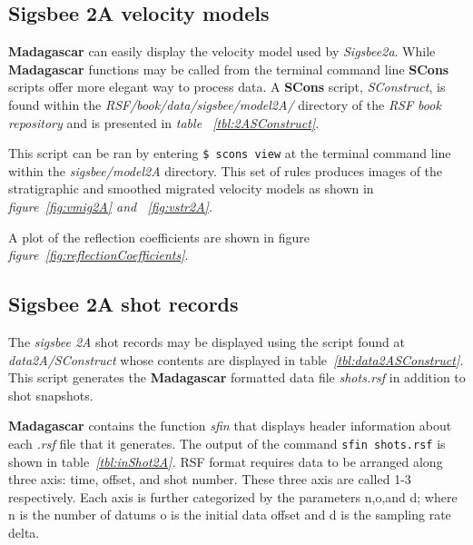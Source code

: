 \subsection{Sigsbee 2A velocity models}
\textbf{Madagascar} can easily display the velocity model used by \emph{Sigsbee2a}.  While \textbf{Madagascar} functions may be called from the terminal command line \textbf{SCons} scripts offer more elegant way to process data.  A \textbf{SCons} script, \emph{SConstruct}, is found within the \emph{RSF/book/data/sigsbee/model2A/} directory of the \emph{RSF book repository} and is presented in \emph{table ~\ref{tbl:2ASConstruct}}. 

{
\tiny

\normalsize
}
This script can be ran by entering \texttt{\$ scons view} at the terminal command line within the \emph{sigsbee/model2A} directory.  This set of rules produces images of the stratigraphic and smoothed migrated velocity models as shown in \emph{figure~\ref{fig:vmig2A} and ~\ref{fig:vstr2A}.}  


A plot of the reflection coefficients are shown in figure \emph{figure~\ref{fig:reflectionCoefficients}}.  

\subsection{Sigsbee 2A shot records}
The \emph{sigsbee 2A} shot records may be displayed using the script found at \emph{data2A/SConstruct} whose contents are displayed in table\emph{~\ref{tbl:data2ASConstruct}.}  This script generates the \textbf{Madagascar} formatted data file \emph{shots.rsf} in addition to shot snapshots.
  
{
\tiny

\normalsize
}

\textbf{Madagascar} contains the function \emph{sfin} that displays header information about each \emph{.rsf} file that it generates.  The output of the command \texttt{sfin shots.rsf} is shown in table\emph{~\ref{tbl:inShot2A}.}  RSF format requires data to be arranged along three axis: time, offset, and shot number.  These three axis are called 1-3 respectively.  Each axis is further categorized by the parameters n,o,and d; where n is the number of datums o is the initial data offset and d is the sampling rate delta.  

